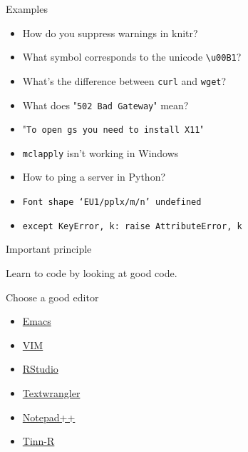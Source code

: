 \documentclass[12pt,t]{beamer}
\newcommand{\bi}{\begin{itemize}}
\newcommand{\ei}{\end{itemize}}
\begin{document}
\begin{frame}{Examples}

\vspace{24pt}

\bi
\item How do you suppress warnings in knitr?
\item What symbol corresponds to the unicode {\tt {\textbackslash}u00B1}?
\item What's the difference between {\tt curl} and {\tt wget}?
\item What does "{\tt 502 Bad Gateway}" mean?
\item "{\tt To open gs you need to install X11}"
\item {\tt mclapply} isn't working in Windows
\item How to ping a server in Python?
\item {\tt Font shape `EU1/pplx/m/n' undefined}
\item {\tt except KeyError, k: raise AttributeError, k}
\ei

\end{frame}


\begin{frame}[c]{Important principle}

\centerline{Learn to code by looking at good code.}

\end{frame}



\begin{frame}{Choose a good editor}

\vspace{24pt}

\bi
\itemsep12pt
\item \href{http://www.emacswiki.org/emacs/}{Emacs}
\item \href{http://www.vim.org/}{VIM}
\item \href{http://www.rstudio.com/ide/}{RStudio}
\item \href{http://www.barebones.com/products/textwrangler/}{Textwrangler}
\item \href{http://notepad-plus-plus.org/}{Notepad++}
\item \href{http://sourceforge.net/projects/tinn-r/}{Tinn-R}
\ei

\end{frame}
\end{document}
